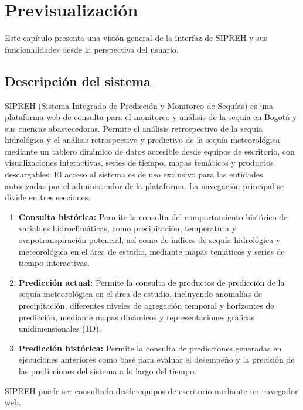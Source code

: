 \chapter{Previsualización}
\label{ch:previsualizacion}

Este capítulo presenta una visión general de la interfaz de SIPREH y sus funcionalidades desde la perspectiva del usuario.

\section{Descripción del sistema}
\label{sec:descripcion_sistema}

SIPREH (Sistema Integrado de Predicción y Monitoreo de Sequías) es una plataforma web de consulta para el monitoreo y análisis de la sequía en Bogotá y sus cuencas abastecedoras. Permite el análisis retrospectivo de la sequía hidrológica y el análisis retrospectivo y predictivo de la sequía meteorológica mediante un tablero dinámico de datos accesible desde equipos de escritorio, con visualizaciones interactivas, series de tiempo, mapas temáticos y productos descargables. El acceso al sistema es de uso exclusivo para las entidades autorizadas por el administrador de la plataforma. La navegación principal se divide en tres secciones:

\begin{enumerate}
    \item \textbf{Consulta histórica:} Permite la consulta del comportamiento histórico de variables hidroclimáticas, como precipitación, temperatura y evapotranspiración potencial, así como de índices de sequía hidrológica y meteorológica en el área de estudio, mediante mapas temáticos y series de tiempo interactivas.
    \item \textbf{Predicción actual:} Permite la consulta de productos de predicción de la sequía meteorológica en el área de estudio, incluyendo anomalías de precipitación, diferentes niveles de agregación temporal y horizontes de predicción, mediante mapas dinámicos y representaciones gráficas unidimensionales (1D).
    \item \textbf{Predicción histórica:} Permite la consulta de predicciones generadas en ejecuciones anteriores como base para evaluar el desempeño y la precisión de las predicciones del sistema a lo largo del tiempo.
\end{enumerate}

\begin{remark}
SIPREH puede ser consultado desde equipos de escritorio mediante un navegador web.
\end{remark}

